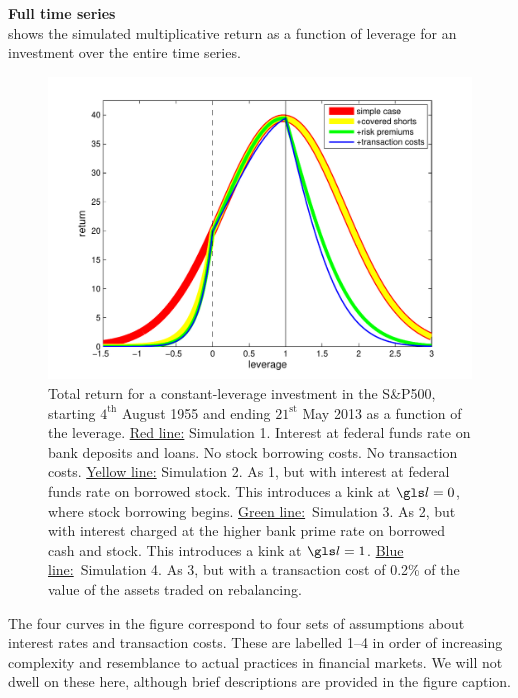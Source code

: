 \textbf{Full time series}\\
 shows the simulated multiplicative return as a function of leverage for an investment over the entire time series.
\begin{figure}
\centering
\includegraphics[width=\textwidth]{./chapter_4/figs/sme_fig1.pdf}
\caption{Total return for a constant-leverage investment in the S\&P500, starting $4^{\text{th}}$ August 1955 and ending $21^{\text{st}}$ May 2013 as a function of the leverage.
\newline \underline{Red line:} Simulation 1. Interest at federal funds rate on bank deposits and loans. No stock borrowing costs. No transaction costs.
\newline \underline{Yellow line:} Simulation 2. As 1, but with interest at federal funds rate on borrowed stock. This introduces a kink at $\l=0$, where stock borrowing begins.
\newline \underline{Green line:}\ Simulation 3. As 2, but with interest charged at the higher bank prime rate on borrowed cash and stock. This introduces a kink at $\l=1$.
\newline \underline{Blue line:}\ Simulation 4. As 3, but with a transaction cost of 0.2\% of the value of the assets traded on rebalancing.}
\end{figure}
The four curves in the figure correspond to four sets of assumptions about interest rates and transaction costs. These are labelled 1--4 in order of increasing complexity and resemblance to actual practices in financial markets. We will not dwell on these here, although brief descriptions are provided in the figure caption.

